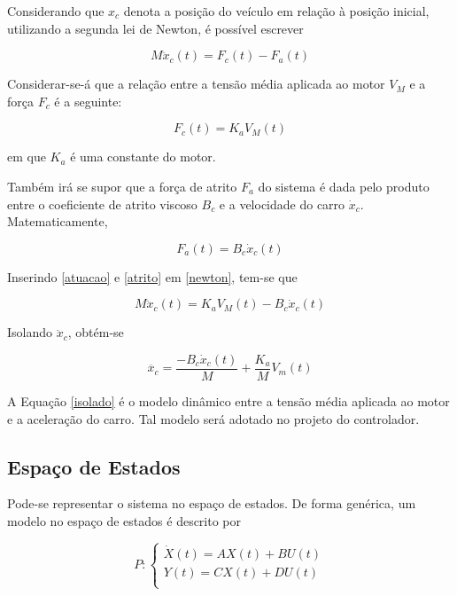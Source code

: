 Considerando que $x_c$ denota a posição do veículo em relação à posição inicial, utilizando a segunda lei de Newton, é possível escrever

\begin{equation}
    M\ddot{x}_c(t)=F_c(t)-F_a(t)
    \label{newton}
\end{equation}

Considerar-se-á que a relação entre a tensão média aplicada ao motor $V_M$ e a força $F_c$ é a seguinte:

\begin{equation}
    F_c(t)=K_aV_M(t)
    \label{atuacao}
\end{equation}

\noindent em que $K_a$ é uma constante do motor.

Também irá se supor que a força de atrito $F_a$ do sistema é dada pelo produto entre o coeficiente de atrito viscoso $B_c$ e a velocidade do carro $\dot{x}_c$. Matematicamente, 

\begin{equation}
    F_a(t)=B_c\dot{x}_c(t)
    \label{atrito}
\end{equation}

Inserindo \eqref{atuacao} e \eqref{atrito} em \eqref{newton}, tem-se que

\begin{equation}
    M\ddot{x}_c(t)=K_aV_M(t)-B_c\dot{x}_c(t)
    \label{newton2}
\end{equation}

Isolando $\ddot{x}_c$, obtém-se

\begin{equation}
    \ddot{x_c}=\frac{-B_c\dot{x}_c(t)}{M}+\frac{K_a}{M}V_m(t)
    \label{isolado}
\end{equation}

A Equação \eqref{isolado} é o modelo dinâmico entre a tensão média aplicada ao motor e a aceleração do carro. Tal modelo será adotado no projeto do controlador.

\subsection{Espaço de Estados}
Pode-se representar o sistema no espaço de estados. De forma genérica, um modelo no espaço de estados é descrito por \cite{ogata2010engenharia}

\begin{equation}
    P :\begin{cases} 
        \dot{X}(t) = AX(t) + BU(t) \\
        Y(t) = CX(t) + DU(t) \\
        \end{cases}
    \label{modelo_espaco_estados}
\end{equation}


